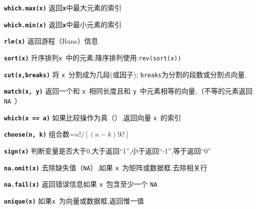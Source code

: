 \documentclass[landscape]{article}
\newcommand{\code}{\texttt}
\newcommand{\bcode}[1]{\texttt{\textbf{#1}}}
\begin{document}
\begin{multicols*}{3}
\bcode{which.max(x)}  返回\bcode{x}中最大元素的索引

\bcode{which.min(x)}  返回\bcode{x}中最小元素的索引


\bcode{rle(x)}  返回游程（Runs）信息

\bcode{sort(x)}  升序排列\code{x}~中的元素;降序排列使用:\code{rev(sort(x))}

\bcode{cut(x,breaks)}   将 \code{x}~分割成为几段(或因子); \code{breaks}为分割的段数或分割点向量.

\bcode{match(x, y)}  返回一个和 \code{x}~相同长度且和 \code{y}~中元素相等的向量,（不等的元素返回\code{NA}~）

\bcode{which(x == a)}  如果比较操作为真（\T）,返回向量 \code{x}~的索引

\bcode{choose(n, k)}  组合数=$n!/[(n-k)!k!]$


\bcode{sign(x)}    判断变量是否大于0,大于返回“1”,小于返回“-1”,等于返回“0”

\bcode{na.omit(x)}  去除缺失值（\code{NA}）,如果 \code{x}~为矩阵或数据框,去除相关行

\bcode{na.fail(x)}   返回错误信息如果 \code{x}~包含至少一个 \code{NA}

\bcode{unique(x)}   如果\code{x}~为向量或数据框,返回惟一值


\end{multicols*}
\end{document}
